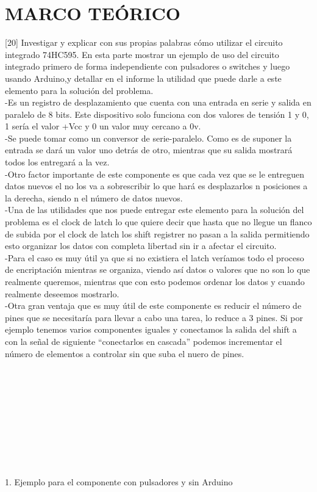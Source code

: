 \documentclass{article}
\begin{document}
\newpage
\section{MARCO TEÓRICO}
\label{marco}
[20] Investigar y explicar con sus propias palabras cómo utilizar el circuito integrado 74HC595. En esta parte mostrar un ejemplo de uso del circuito integrado primero de forma independiente con pulsadores o switches y luego usando Arduino,y detallar en el informe la utilidad que puede darle a este elemento para la solución del problema.\\

-Es un registro de desplazamiento que cuenta con una entrada en serie y salida en paralelo de 8 bits. Este dispositivo solo funciona con dos valores de tensión 1 y 0, 1 sería el valor +Vcc y 0 un valor muy cercano a 0v.\\

-Se puede tomar como un conversor de serie-paralelo. Como es de suponer la entrada se dará un valor uno detrás de otro, mientras que su salida mostrará todos los entregará a la vez.\\

-Otro factor importante de este componente es que cada vez que se le entreguen datos nuevos el no los va a sobrescribir lo que hará es desplazarlos n posiciones a la derecha, siendo n el número de datos nuevos.\\

-Una de las utilidades que nos puede entregar este elemento para la solución del problema es el clock de latch lo que quiere decir que hasta que no llegue un flanco de subida por el clock de latch los shift registrer no pasan a la salida permitiendo esto organizar los datos con completa libertad sin ir a afectar el circuito.\\

-Para el caso es muy útil ya que si no existiera el latch veríamos todo el proceso de encriptación mientras se organiza, viendo así datos o valores que no son lo que realmente queremos, mientras que con esto podemos ordenar los datos y cuando realmente deseemos mostrarlo.\\

-Otra gran ventaja que es muy útil de este componente es reducir el número de pines que se necesitaría para llevar a cabo una tarea, lo reduce a 3 pines. Si por ejemplo tenemos varios componentes iguales y conectamos la salida del shift a con la señal de siguiente “conectarlos en cascada” podemos incrementar el número de elementos a controlar sin que suba el nuero de pines.\\
\\
\\
\\
\\
\\
\\
\\
\\
\\
\item 1. Ejemplo para el componente con pulsadores y sin Arduino\\
\end{document}
